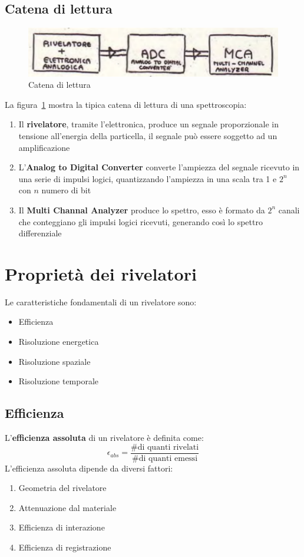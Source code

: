 \subsection{Catena di lettura}
\begin{figure}[htbp]
\begin{center}
\includegraphics[scale=1]{./Immagini/CatenaDiLettura.png}
\caption{Catena di lettura}
\label{fig:CatLettura}
\end{center}
\end{figure}
La figura~\ref{fig:CatLettura} mostra la tipica catena di lettura di una spettroscopia:
\begin{enumerate}
\item Il \textbf{rivelatore}, tramite l'elettronica, produce un segnale proporzionale in tensione all'energia della particella, il segnale pu\`o essere soggetto ad un amplificazione
\item L'\textbf{Analog to Digital Converter} converte l'ampiezza del segnale ricevuto in una serie di impulsi logici, quantizzando l'ampiezza in una scala tra 1 e $2^n$ con $n$ numero di bit
\item Il \textbf{Multi Channal Analyzer} produce lo spettro, esso \`e formato da $2^n$ canali che conteggiano gli impulsi logici ricevuti, generando cos\`i lo spettro differenziale
\end{enumerate}
\section{Propriet\`a dei rivelatori}
Le caratteristiche fondamentali di un rivelatore sono:
\begin{itemize}
\item Efficienza
\item Risoluzione energetica
\item Risoluzione spaziale
\item Risoluzione temporale
\end{itemize}
\subsection{Efficienza}
L'\textbf{efficienza assoluta} di un rivelatore \`e definita come:
\begin{equation*}
\epsilon_{abs} = \frac{\text{\# di quanti rivelati}}{\text{\# di quanti emessi}}
\end{equation*}
L'efficienza assoluta dipende da diversi fattori:
\begin{enumerate}
\item Geometria del rivelatore
\item Attenuazione dal materiale
\item Efficienza di interazione
\item Efficienza di registrazione
\end{enumerate}
